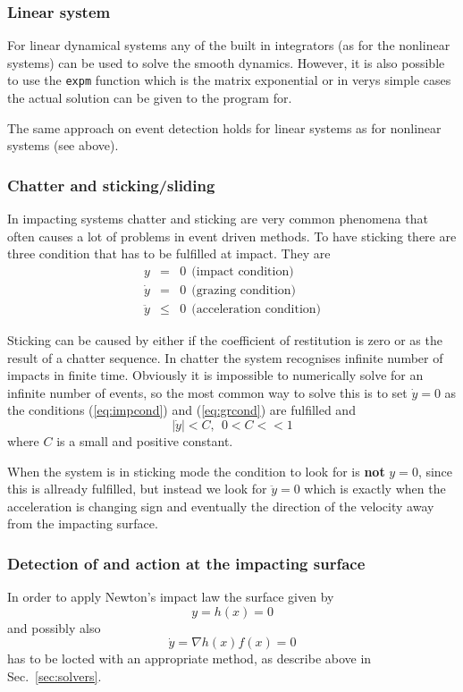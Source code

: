 \documentclass[10pt]{article}
\begin{document}
\subsubsection*{Linear system}
For linear dynamical systems any of the built in integrators (as for the nonlinear systems) can be used to solve the smooth dynamics. However, it is also possible to use the \verb|expm| function which is the matrix exponential or in verys simple cases the actual solution can be given to the program for. 

The same approach on event detection holds for linear systems as for nonlinear systems (see above).

\subsubsection*{Chatter and sticking/sliding}
In impacting systems chatter and sticking are very common phenomena that often causes a lot of problems in event driven methods. To have sticking there are three condition that has to be fulfilled at impact. They are
\begin{eqnarray}
y & = & 0 \ \ \text{(impact condition)} \label{eq:impcond}\\
\dot{y} & = & 0 \ \ \text{(grazing condition)} \label{eq:grcond}\\
\ddot{y} & \leq & 0 \ \ \text{(acceleration condition)} \label{eq:accond}
\end{eqnarray}

Sticking can be caused by either if the coefficient of restitution is zero or as the result of a chatter sequence. In chatter the system recognises infinite number of impacts in finite time. Obviously it is impossible to numerically solve for an infinite number of events, so the most common way to solve this is to set $\dot{y} = 0$ as the conditions (\ref{eq:impcond}) and (\ref{eq:grcond}) are fulfilled and
\begin{equation}
|\dot{y}| < C, \ \ 0 < C << 1  \label{eq:C}
\end{equation}
where $C$ is a small and positive constant. 

When the system is in sticking mode the condition to look for is \textbf{not} $y = 0$, since this is allready fulfilled, but instead we look for $\ddot{y} = 0$ which is exactly when the acceleration is changing sign and eventually the direction of the velocity away from the impacting surface.

\subsubsection{Detection of and action at the impacting surface}
In order to apply Newton's impact law the surface given by
\begin{equation}
y = h(x) = 0
\end{equation}
and possibly also
\begin{equation}
\dot{y} = \nabla h(x)f(x) = 0
\end{equation}
has to be locted with an appropriate method, as describe above in Sec.~\ref{sec:solvers}.
\end{document}
